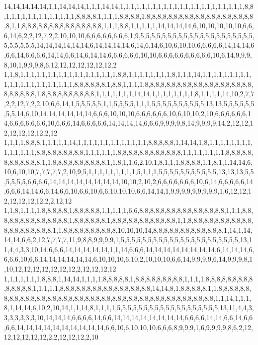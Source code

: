 14,14,14,14,14,1,1,14,14,14,1,1,1,14,14,1,1,1,1,1,1,1,1,1,1,1,1,1,1,1,1,1,1,1,1,1,1,1,8,8,1,1,1,1,1,1,1,1,1,1,1,1,1,8,8,8,8,1,1,1,1,8,8,8,8,1,8,8,8,8,8,8,8,8,8,8,8,8,8,8,8,8,8,8,8,8,8,1,1,8,8,8,8,8,8,8,8,8,8,8,8,8,8,8,1,1,1,8,8,1,1,1,1,1,14,14,14,14,6,10,10,10,10,10,6,6,6,14,6,2,2,12,7,2,2,10,10,10,6,6,6,6,6,6,6,6,1,9,5,5,5,5,5,5,5,5,5,5,5,5,5,5,5,5,5,5,5,5,5,5,5,5,5,5,5,14,14,14,14,14,14,6,14,14,14,14,6,14,6,14,6,10,6,10,10,6,6,6,6,6,14,14,14,6,6,6,14,6,6,6,6,14,14,6,6,14,6,14,14,6,6,6,6,6,6,10,10,6,6,6,6,6,6,6,6,6,6,10,6,14,9,9,9,8,10,1,9,9,9,8,6,12,12,12,12,12,12,12,2
1,1,8,1,1,1,1,1,1,1,1,1,1,1,1,1,1,1,1,1,1,8,8,1,1,1,1,1,1,1,1,8,1,1,1,14,1,1,1,1,1,1,1,1,1,1,1,1,1,1,1,1,1,1,1,1,1,1,8,8,8,8,8,8,1,8,8,1,1,1,1,8,8,8,8,8,8,8,8,8,8,8,8,8,8,8,8,8,8,8,8,8,8,8,8,8,8,1,8,8,8,8,8,8,8,8,8,8,1,1,1,1,1,1,1,14,14,1,1,1,1,1,1,1,1,8,1,1,1,1,14,10,2,7,7,2,2,12,7,2,2,10,6,6,14,1,5,5,5,5,5,1,1,5,5,5,5,1,1,1,5,5,5,5,5,5,5,5,5,5,13,13,5,5,5,5,5,5,5,5,14,6,10,14,14,14,14,14,14,6,6,6,10,10,10,6,6,6,6,6,6,10,6,10,10,2,10,6,6,6,6,6,6,14,6,6,6,6,6,6,6,10,6,6,6,14,6,6,6,6,6,14,14,14,14,6,6,6,9,9,9,9,8,14,9,9,9,9,14,2,12,12,12,12,12,12,12,2,12
1,1,1,1,8,8,8,1,1,1,1,1,14,1,1,1,1,1,1,1,1,1,1,1,1,1,8,8,8,8,8,1,14,14,1,8,1,1,1,1,1,1,1,1,1,1,1,1,1,1,8,8,8,8,8,8,8,8,8,1,1,1,1,1,1,8,8,8,8,8,8,8,8,8,8,8,8,1,1,1,1,1,1,1,1,8,8,8,8,8,8,8,8,8,8,8,8,1,1,8,8,8,8,8,8,8,8,8,8,1,1,8,1,1,6,2,10,1,8,1,1,1,8,8,8,8,1,1,8,1,1,14,14,6,10,6,10,10,7,7,7,7,7,2,10,9,5,1,1,1,1,1,1,1,1,1,5,1,1,1,5,5,5,5,5,5,5,5,5,5,5,13,13,13,5,5,5,5,5,5,6,6,6,6,14,14,14,14,14,14,14,14,10,10,2,10,2,6,6,6,6,6,6,6,10,6,14,6,6,6,6,6,14,6,6,6,14,14,6,6,14,6,6,10,6,6,10,6,6,10,10,10,6,6,14,14,1,9,9,9,9,9,9,9,9,9,1,6,12,12,12,12,12,12,12,2,2,12,12
1,1,8,1,1,1,1,8,8,8,8,8,1,8,8,8,8,8,1,1,1,1,1,6,6,8,8,8,8,8,8,8,8,8,8,8,8,8,8,8,8,1,1,1,8,8,8,8,8,8,8,8,8,8,8,8,8,8,1,8,8,8,8,8,8,1,8,8,8,8,8,8,8,8,8,8,8,8,1,1,8,8,8,8,8,8,8,8,8,8,8,8,8,8,8,8,8,8,8,8,8,1,1,8,8,8,8,8,8,8,8,8,8,10,10,10,14,8,8,8,8,8,8,8,8,8,8,8,8,8,1,14,1,14,14,14,6,6,2,12,7,7,7,7,11,9,8,8,9,9,9,9,1,5,5,5,5,5,5,5,5,5,5,5,5,5,5,5,5,5,5,5,5,5,5,13,11,4,4,3,3,10,14,6,6,6,14,14,14,14,14,1,1,14,6,6,6,14,14,14,14,14,14,14,14,6,14,14,14,6,6,6,6,10,6,6,14,14,14,14,14,14,6,10,10,10,6,10,2,10,10,10,6,6,14,9,9,9,9,6,14,9,9,9,8,1,10,12,12,12,12,12,12,12,2,12,12,12,12
1,1,1,1,1,1,1,8,8,8,1,14,14,1,1,1,1,8,8,8,8,8,1,8,8,8,8,8,8,8,8,8,1,1,1,1,8,8,8,8,8,8,8,8,8,8,8,8,8,8,1,1,1,1,1,8,8,8,8,8,8,8,8,8,8,8,8,8,8,8,8,8,14,14,8,1,8,8,8,8,8,1,1,8,8,8,8,8,8,8,8,8,8,8,8,8,8,8,8,8,8,8,8,8,8,8,8,8,8,8,8,8,8,8,8,8,8,8,8,8,8,8,8,8,8,8,8,8,1,1,14,1,1,1,8,1,14,14,6,10,2,10,14,1,1,14,8,1,1,1,1,5,5,5,5,5,5,5,5,5,5,5,5,5,5,5,5,5,5,5,13,11,4,4,3,3,3,3,3,3,3,10,14,14,14,6,6,6,6,14,6,6,14,14,14,14,14,14,14,14,6,6,6,6,14,14,6,6,14,6,6,6,6,14,14,14,14,14,14,14,14,14,14,6,6,10,6,10,10,10,6,6,6,8,9,9,9,1,6,9,9,9,9,8,6,2,12,12,12,12,12,12,2,2,12,12,12,2,10
